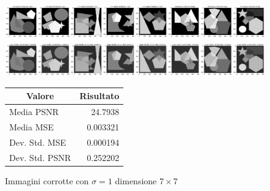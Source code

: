 \begin{figure}[H]
    \centering
    \begin{minipage}[h]{0.5\textwidth}
        \centering
    \includegraphics[width=\linewidth]{imgRel/datasetcorrotto/datasetcorrotto7x7.png}\label{fig:imgcorrotte2}
    \end{minipage}%
    \begin{minipage}[h]{0.5\textwidth}
        \centering
        \begin{tabular}{|lr|}
            \hline
            \multicolumn{1}{|c}{\textbf{Valore}} & \multicolumn{1}{c|}{\textbf{Risultato}} \\ \hline
                Media PSNR & 24.7938 \\ 
                Media MSE & 0.003321 \\ 
                Dev. Std. MSE & 0.000194 \\ 
                Dev. Std. PSNR & 0.252202 \\ \hline
            \end{tabular}\label{tab:tabcorrotte2}
    \end{minipage}
    \captionsetup{labelformat=andtable}
    \caption{Immagini corrotte con $\sigma = 1$ dimensione $7 \times 7$}
\end{figure}

